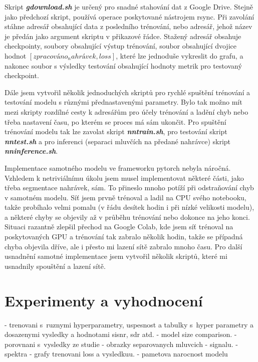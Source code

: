 Skript \textbf{\textit{gdownload.sh}} je určený pro snadné stahování dat z Google Drive. Stejně jako předchozí skript, používá operace poskytované nástrojem rsync. Při zavolání stáhne adresář obsahující data z posledního trénování, nebo adresář, jehož název je předán jako argument skriptu v přikazové řádce.   
Stažený adresář obsahuje checkpointy, soubory obsahující výstup trénování, soubor obsahující dvojice hodnot $[zpracováno_nahrávek, loss]$, které lze jednoduše vykreslit do grafu, a nakonec soubor s výsledky testování obsahující hodnoty metrik pro testovaný checkpoint.

Dále jsem vytvořil několik jednoduchých skriptů pro rychlé spuštění trénování a testování modelu s různými přednastavenými parametry. Bylo tak možno mít mezi skripty rozdílné cesty k adresářům pro účely trénování a ladění chyb nebo třeba nastavení času, po kterém se proces má sám ukončit. Pro spuštění trénování modelu tak lze zavolat skript \textbf{\textit{nntrain.sh}}, pro testování skript \textbf{\textit{nntest.sh}} a pro inferenci (separaci mluvčích na předané nahrávce) skript \textbf{\textit{nninference.sh}}.

\bigskip

Implementace samotného modelu ve frameworku pytorch nebyla náročná. Vzhledem k netriviálnímu úkolu jsem musel implementovat některé části, jako třeba segmentace nahrávek, sám. To přineslo mnoho potíží při odstraňování chyb v samotném modelu. Síť jsem prvně trénoval a ladil na CPU svého notebooku, takže probíhalo velmi pomalu (v řádu desítek hodin i při nízké velikosti modelu), a některé chyby se objevily až v průběhu trénování nebo dokonce na jeho konci. Situaci razantně zlepšil přechod na Google Colab, kde jsem síť trénoval na poskytovaných GPU a trénování tak zabralo  několik hodin, takže se případná chyba objevila dříve, ale i přesto mi lazení sítě zabralo mnoho času. Pro další usnadnění samotné implementace jsem vytvořil několik skriptů, které mi usnadnily spouštění a lazení sítě.



\chapter{Experimenty a vyhodnocení}
\label{experimenty}
- trenovani s~ruznymi hyperparametry, uspesnost a tabulky s~hyper parametry a dosazenymi vysledky a hodnotami sisnr, sdr atd.
- model size comparison.
- porovnani s~vysledky ze studie
- obrazky separovanych mluvcich - signalu.
- spektra
- grafy trenovani loss a vysledkuu.
- pametova narocnost modelu


